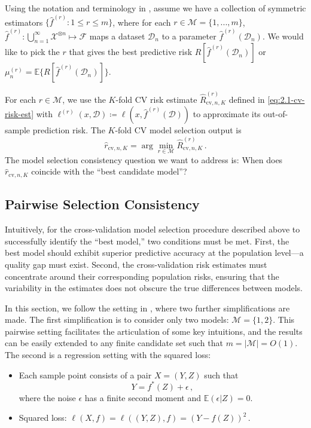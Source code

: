 \documentclass[11pt]{article}
\theoremstyle{plain}
\newcommand{\cv}{{\mathrm{cv}}}
\newcommand{\D}{{\mathcal{D}}}
\newcommand{\X}{{\mathcal{X}}}
\begin{document}
Using the notation and terminology in , assume we have a collection of symmetric estimators $\{\hat f^{(r)}:1\le r\le m\}$, where for each $r\in\mathcal M=\{1,...,m\}$, $\hat f^{(r)}:\bigcup_{n=1}^\infty \X^{\otimes n}\mapsto \mathcal F$ maps a dataset $\D_n$ to a parameter $\hat f^{(r)}(\D_n)$. We would like to pick the $r$ that gives the best predictive risk $R[\hat f^{(r)}(\D_n)]$ or $\mu^{(r)}_n=\mathbb E\{R[\hat f^{(r)}(\D_n)]\}$.  

 For each $r\in\mathcal M$, we use the $K$-fold CV risk estimate $\hat R^{(r)}_{\cv,n,K}$ defined in \eqref{eq:2.1-cv-risk-est} with $\ell^{(r)}(x,\D)\coloneqq \ell(x,\hat f^{(r)}(\D))$ to approximate its out-of-sample prediction risk. The $K$-fold CV model selection output is
 $$
 \hat r_{\cv, n,K} =\arg\min_{r\in\mathcal M} \hat R^{(r)}_{\cv,n,K}\,.
 $$
The model selection consistency question we want to address is: When does $\hat r_{\cv,n,K}$ coincide with the ``best candidate model''?

\subsection{Pairwise Selection Consistency}\label{subsec:3.1-yang07}
Intuitively, for the cross-validation model selection procedure described above to successfully identify the ``best model,'' two conditions must be met. First, the best model should exhibit superior predictive accuracy at the population level—a quality gap must exist. Second, the cross-validation risk estimates must concentrate around their corresponding population risks, ensuring that the variability in the estimates does not obscure the true differences between models.

In this section, we follow the setting in \cite{yang2007consistency}, where two further simplifications are made.  The first simplification is to consider only two models: $\mathcal M=\{1,2\}$. This pairwise setting facilitates the articulation of some key intuitions, and the results can be easily extended to any finite candidate set such that $m=|\mathcal M|=O(1)$. The second is a regression setting with the squared loss:
\begin{itemize}
    \item Each sample point consists of a pair $X=(Y,Z)$ such that 
    \begin{equation}\label{eq:3.1-reg-model}
    Y=f^*(Z)+\epsilon\,,\end{equation} 
    where the noise $\epsilon$ has a finite second moment and $\mathbb E(\epsilon|Z)=0$.
    \item Squared loss: $\ell(X,f)=\ell((Y,Z),f)=(Y-f(Z))^2$\,.
\end{itemize}
\end{document}
